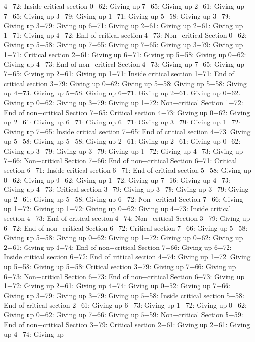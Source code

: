 4−72: Inside critical section
0−62: Giving up
7−65: Giving up
2−61: Giving up
7−65: Giving up
3−79: Giving up
1−71: Giving up
5−58: Giving up
3−79: Giving up
3−79: Giving up
6−71: Giving up
2−61: Giving up
2−61: Giving up
1−71: Giving up
4−72: End of critical section
4−73: Non−critical Section
0−62: Giving up
5−58: Giving up
7−65: Giving up
7−65: Giving up
3−79: Giving up
1−71: Critical section
2−61: Giving up
6−71: Giving up
5−58: Giving up
0−62: Giving up
4−73: End of non−critical Section
4−73: Giving up
7−65: Giving up
7−65: Giving up
2−61: Giving up
1−71: Inside critical section
1−71: End of critical section
3−79: Giving up
0−62: Giving up
5−58: Giving up
5−58: Giving up
4−73: Giving up
5−58: Giving up
6−71: Giving up
2−61: Giving up
0−62: Giving up
0−62: Giving up
3−79: Giving up
1−72: Non−critical Section
1−72: End of non−critical Section
7−65: Critical section
4−73: Giving up
0−62: Giving up
2−61: Giving up
6−71: Giving up
6−71: Giving up
3−79: Giving up
1−72: Giving up
7−65: Inside critical section
7−65: End of critical section
4−73: Giving up
5−58: Giving up
5−58: Giving up
2−61: Giving up
2−61: Giving up
0−62: Giving up
3−79: Giving up
3−79: Giving up
1−72: Giving up
4−73: Giving up
7−66: Non−critical Section
7−66: End of non−critical Section
6−71: Critical section
6−71: Inside critical section
6−71: End of critical section
5−58: Giving up
0−62: Giving up
0−62: Giving up
1−72: Giving up
7−66: Giving up
4−73: Giving up
4−73: Critical section
3−79: Giving up
3−79: Giving up
3−79: Giving up
2−61: Giving up
5−58: Giving up
6−72: Non−critical Section
7−66: Giving up
1−72: Giving up
1−72: Giving up
0−62: Giving up
4−73: Inside critical section
4−73: End of critical section
4−74: Non−critical Section
3−79: Giving up
6−72: End of non−critical Section
6−72: Critical section
7−66: Giving up
5−58: Giving up
5−58: Giving up
0−62: Giving up
1−72: Giving up
0−62: Giving up
2−61: Giving up
4−74: End of non−critical Section
7−66: Giving up
6−72: Inside critical section
6−72: End of critical section
4−74: Giving up
1−72: Giving up
5−58: Giving up
5−58: Critical section
3−79: Giving up
7−66: Giving up
6−73: Non−critical Section
6−73: End of non−critical Section
6−73: Giving up
1−72: Giving up
2−61: Giving up
4−74: Giving up
0−62: Giving up
7−66: Giving up
3−79: Giving up
3−79: Giving up
5−58: Inside critical section
5−58: End of critical section
2−61: Giving up
6−73: Giving up
1−72: Giving up
0−62: Giving up
0−62: Giving up
7−66: Giving up
5−59: Non−critical Section
5−59: End of non−critical Section
3−79: Critical section
2−61: Giving up
2−61: Giving up
4−74: Giving up
